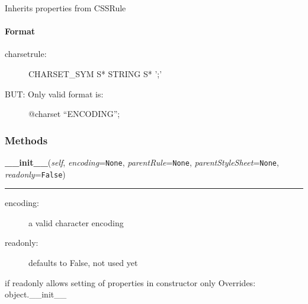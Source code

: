 Inherits properties from CSSRule



\hypertarget{format}{}
\paragraph*{Format}
\label{format}
\begin{description}
\item[{charsetrule:}] \leavevmode 
CHARSET{\_}SYM S* STRING S* ';'

\item[{BUT: Only valid format is:}] \leavevmode 
@charset ``ENCODING'';

\end{description}


  \subsubsection{Methods}

    \vspace{0.5ex}

\hspace{.8\funcindent}\begin{boxedminipage}{\funcwidth}

    \raggedright \textbf{\_\_init\_\_}(\textit{self}, \textit{encoding}={\tt None}, \textit{parentRule}={\tt None}, \textit{parentStyleSheet}={\tt None}, \textit{readonly}={\tt False})

    \vspace{-1.5ex}

    \rule{\textwidth}{0.5\fboxrule}
\setlength{\parskip}{2ex}
\begin{description}
\item[{encoding:}] \leavevmode 
a valid character encoding

\item[{readonly:}] \leavevmode 
defaults to False, not used yet

\end{description}

if readonly allows setting of properties in constructor only
\setlength{\parskip}{1ex}
      Overrides: object.\_\_init\_\_

    \end{boxedminipage}

